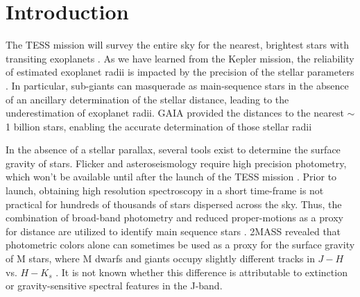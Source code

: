 \chapter{Introduction} \label{chap:introduction}

The TESS mission will survey the entire sky for the nearest, brightest stars with transiting exoplanets \citep{Ricker2015,Sullivan2015}.  As we have learned from the Kepler mission, the reliability of estimated exoplanet radii is impacted by the precision of the stellar parameters \citep{Plavchan2014,Kane2014,Howell2014,Bastien2014,Mann2012}. In particular, sub-giants can masquerade as main-sequence stars in the absence of an ancillary determination of the stellar distance, leading to the underestimation of exoplanet radii. GAIA  provided the distances to the nearest $\sim$1 billion stars, enabling the accurate determination of those stellar radii \citep{Prusti2016,Brown2016,Lindegren2016,Stassun2016}


In the absence of a stellar parallax, several tools exist to determine the surface gravity of stars.  Flicker and asteroseismology require high precision photometry, which won't be available until after the launch of the TESS mission \citep{Bastien2013,Bastien2016}. Prior to launch, obtaining high resolution spectroscopy in a short time-frame is not practical for hundreds of thousands of stars dispersed across the sky.  Thus, the combination of broad-band photometry and reduced proper-motions as a proxy for distance are utilized to identify main sequence stars \citep{Bastien2016,Huber2014,Lepine2011,Brown2011,Gould2003}. 2MASS revealed that photometric colors alone can sometimes be used as a proxy for the surface gravity of M stars, where M dwarfs and giants occupy slightly different tracks in $J-H$ vs. $H-K_s$ \citep{Ciardi2011,Plavchan2008,Plavchan2006,Skrutskie2006}.  It is not known whether this difference is attributable to extinction or gravity-sensitive spectral features in the J-band.  

